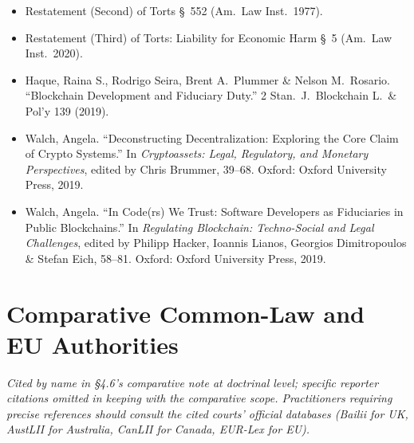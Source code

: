 \documentclass[11pt, twoside, openright]{book}
\newcommand{\sect}[1]{\S#1}
\begin{document}
\begin{itemize}[leftmargin=1.5em, itemsep=4pt]
  \item Restatement (Second) of Torts \S~552 (Am.~Law Inst.~1977).
  \item Restatement (Third) of Torts: Liability for Economic Harm \S~5 (Am.~Law Inst.~2020).
  \item Haque, Raina S., Rodrigo Seira, Brent A.~Plummer \& Nelson M.~Rosario. ``Blockchain Development and Fiduciary Duty.'' 2 Stan.~J.~Blockchain L.~\& Pol'y 139 (2019).
  \item Walch, Angela. ``Deconstructing Decentralization: Exploring the Core Claim of Crypto Systems.'' In \textit{Cryptoassets: Legal, Regulatory, and Monetary Perspectives}, edited by Chris Brummer, 39--68. Oxford: Oxford University Press, 2019.
  \item Walch, Angela. ``In Code(rs) We Trust: Software Developers as Fiduciaries in Public Blockchains.'' In \textit{Regulating Blockchain: Techno-Social and Legal Challenges}, edited by Philipp Hacker, Ioannis Lianos, Georgios Dimitropoulos \& Stefan Eich, 58--81. Oxford: Oxford University Press, 2019.
\end{itemize}

\section*{Comparative Common-Law and EU Authorities}

\noindent\textit{Cited by name in \sect{4.6}'s comparative note at doctrinal level; specific reporter citations omitted in keeping with the comparative scope. Practitioners requiring precise references should consult the cited courts' official databases (Bailii for UK, AustLII for Australia, CanLII for Canada, EUR-Lex for EU).}
\end{document}
